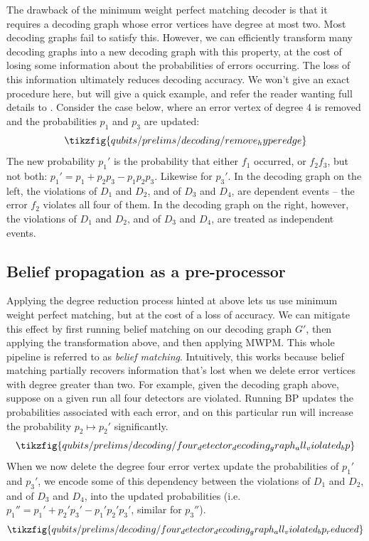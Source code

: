 The drawback of the minimum weight perfect matching decoder is that it requires a decoding graph whose error vertices have degree at most two.
Most decoding graphs fail to satisfy this.
However, we can efficiently transform many decoding graphs into a new decoding graph with this property, at the cost of losing some information about the probabilities of errors occurring.
The loss of this information ultimately reduces decoding accuracy.
We won't give an exact procedure here, but will give a quick example, and refer the reader wanting full details to .
Consider the case below, where an error vertex of degree 4 is removed and the probabilities $p_1$ and $p_3$ are updated:
\begin{equation}
     \tikzfig{qubits/prelims/decoding/remove_hyperedge}
\end{equation}
The new probability $p_1'$ is the probability that either $f_1$ occurred, or $f_2 f_3$, but not both: $p_1' = p_1 + p_2 p_3 - p_1 p_2 p_3$.
Likewise for $p_3'$.
In the decoding graph on the left, the violations of $D_1$ and $D_2$, and of $D_3$ and $D_4$, are dependent events -- the error $f_2$ violates all four of them.
In the decoding graph on the right, however, the violations of $D_1$ and $D_2$, and of $D_3$ and $D_4$, are treated as independent events.

\subsection{Belief propagation as a pre-processor}

Applying the degree reduction process hinted at above lets us use minimum weight perfect matching, but at the cost of a loss of accuracy.
We can mitigate this effect by first running belief matching on our decoding graph $G'$, then applying the transformation above, and then applying MWPM.
This whole pipeline is referred to as \textit{belief matching}.
Intuitively, this works because belief matching partially recovers information that's lost when we delete error vertices with degree greater than two.
For example, given the decoding graph above, suppose on a given run all four detectors are violated.
Running BP updates the probabilities associated with each error, and on this particular run will increase the probability $p_2 \mapsto p_2'$ significantly.
\begin{equation}
    \tikzfig{qubits/prelims/decoding/four_detector_decoding_graph_all_violated_bp}
\end{equation}
When we now delete the degree four error vertex update the probabilities of $p_1'$ and $p_3'$, we encode some of this dependency between the violations of $D_1$ and $D_2$, and of $D_3$ and $D_{4}$, into the updated probabilities (i.e.\ $p_1'' = p_1' + p_2' p_3' - p_1' p_2' p_3'$, similar for $p_3''$).
\begin{equation}
    \tikzfig{qubits/prelims/decoding/four_detector_decoding_graph_all_violated_bp_reduced}
\end{equation}
